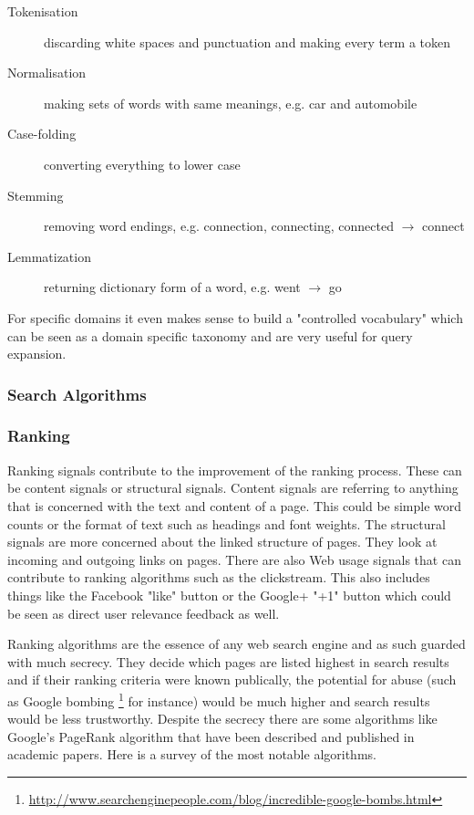 \begin{description}
  \item [Tokenisation] discarding white spaces and punctuation and making every term a token
  \item [Normalisation] making sets of words with same meanings, e.g. car and automobile
  \item [Case-folding] converting everything to lower case
  \item [Stemming] removing word endings, e.g. connection, connecting, connected $\to$ connect
  \item [Lemmatization] returning dictionary form of a word, e.g. went $\to$ go
\end{description}

For specific domains it even makes sense to build a "controlled vocabulary" which can be seen as a domain specific taxonomy and are very useful for query expansion.


\subsubsection*{Search Algorithms}


\subsubsection*{Ranking}

Ranking signals contribute to the improvement of the ranking process. These can be content signals or structural signals. Content signals are referring to anything that is concerned with the text and content of a page. This could be simple word counts or the format of text such as headings and font weights. The structural signals are more concerned about the linked structure of pages. They look at incoming and outgoing links on pages. There are also Web usage signals that can contribute to ranking algorithms such as the clickstream.  This also includes things like the Facebook "like" button or the Google+ "+1" button which could be seen as direct user relevance feedback as well.

Ranking algorithms are the essence of any web search engine and as such guarded with much secrecy. They decide which pages are listed highest in search results and if their ranking criteria were known publically, the potential for abuse (such as Google bombing \footnote{\url{http://www.searchenginepeople.com/blog/incredible-google-bombs.html}} for instance) would be much higher and search results would be less trustworthy. Despite the secrecy there are some algorithms like Google's PageRank algorithm that have been described and published in academic papers. Here is a survey of the most notable algorithms.

